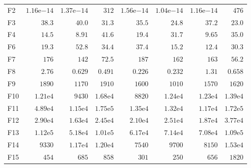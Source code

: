 \begin{tabular}{lrrrrrrr}
F2 & $1.16\mathrm{e}{-14}$ & $1.37\mathrm{e}{-14}$ & $312$ & $1.56\mathrm{e}{-14}$ & $1.04\mathrm{e}{-14}$ & $1.16\mathrm{e}{-14}$ & $476$ \\
F3 & $38.3$ & $40.0$ & $31.3$ & $35.5$ & $24.8$ & $37.2$ & $\mathbf{23.0}$ \\
F4 & $14.5$ & $8.91$ & $41.6$ & $19.4$ & $31.7$ & $9.65$ & $35.0$ \\
F6 & $19.3$ & $52.8$ & $34.4$ & $37.4$ & $15.2$ & $12.4$ & $30.3$ \\
F7 & $176$ & $142$ & $72.5$ & $187$ & $162$ & $163$ & $56.2$ \\
F8 & $2.76$ & $0.629$ & $0.491$ & $0.226$ & $0.232$ & $1.31$ & $0.658$ \\
F9 & $1890$ & $1170$ & $1910$ & $1600$ & $1010$ & $1570$ & $1620$ \\
F10 & $1.21\mathrm{e}{4}$ & $9430$ & $1.68\mathrm{e}{4}$ & $8820$ & $1.24\mathrm{e}{4}$ & $1.23\mathrm{e}{4}$ & $1.39\mathrm{e}{4}$ \\
F11 & $4.89\mathrm{e}{4}$ & $1.15\mathrm{e}{4}$ & $1.75\mathrm{e}{5}$ & $1.35\mathrm{e}{4}$ & $1.32\mathrm{e}{4}$ & $1.17\mathrm{e}{4}$ & $1.72\mathrm{e}{5}$ \\
F12 & $2.90\mathrm{e}{4}$ & $1.63\mathrm{e}{4}$ & $2.45\mathrm{e}{4}$ & $2.10\mathrm{e}{4}$ & $2.51\mathrm{e}{4}$ & $1.87\mathrm{e}{4}$ & $3.77\mathrm{e}{4}$ \\
F13 & $1.12\mathrm{e}{5}$ & $5.18\mathrm{e}{4}$ & $1.01\mathrm{e}{5}$ & $6.17\mathrm{e}{4}$ & $7.14\mathrm{e}{4}$ & $7.08\mathrm{e}{4}$ & $1.09\mathrm{e}{5}$ \\
F14 & $9330$ & $1.17\mathrm{e}{4}$ & $1.20\mathrm{e}{4}$ & $7540$ & $9700$ & $8150$ & $1.53\mathrm{e}{4}$ \\
F15 & $454$ & $685$ & $858$ & $301$ & $250$ & $656$ & $1820$ \\
\bottomrule
\end{tabular}
